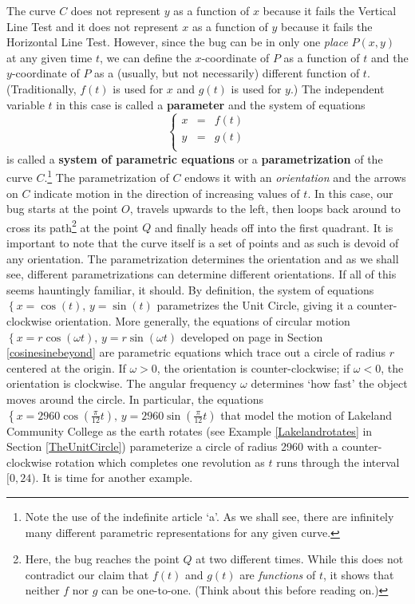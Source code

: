 The curve $C$ does not represent $y$ as a function of $x$ because it fails the Vertical Line Test and it does not represent $x$ as a function of $y$ because it fails the Horizontal Line Test.  However, since the bug can be in only one \textit{place} $P(x,y)$ at any given time $t$, we can define the $x$-coordinate of $P$ as a function of $t$ and the $y$-coordinate of $P$ as a (usually, but not necessarily) different function of $t$. (Traditionally, $f(t)$ is used for $x$ and $g(t)$ is used for $y$.) The independent variable $t$ in this case is called a  \textbf{parameter} and the system of equations \[\left\{ \begin{array}{rcl} x & = & f(t) \\ y & = & g(t) \\ \end{array} \right.\] is called a  \textbf{system of parametric equations} or a  \textbf{parametrization} of the curve $C$.\footnote{Note the use of the indefinite article `a'.  As we shall see, there are infinitely many different parametric representations for any given curve.}   The parametrization of $C$ endows it with an  \textit{orientation} and the arrows on $C$ indicate motion in the direction of increasing values of $t$. In this case, our bug starts at the point $O$, travels upwards to the left, then loops back around to cross its path\footnote{Here, the bug reaches the point $Q$ at two different times. While this does not contradict our claim that $f(t)$ and $g(t)$ are \textit{functions} of $t$, it shows that neither $f$ nor $g$ can be one-to-one.  (Think about this before reading on.)} at the point $Q$ and finally heads off into the first quadrant.   It is important to note that the curve itself is a set of points and as such is devoid of any orientation.  The parametrization determines the orientation and as we shall see, different parametrizations can determine different orientations. If all of this seems hauntingly familiar, it should.  By definition, the system of equations $\left\{ x = \cos(t), \, y = \sin(t) \right.$ parametrizes the Unit Circle, giving it a counter-clockwise orientation.  More generally, the equations of circular motion $\left\{ x = r\cos(\omega t), \, y = r\sin(\omega t) \right.$ developed on page \pageref{equationsforcircularmotion} in Section \ref{cosinesinebeyond} are parametric equations which trace out a circle of radius $r$ centered at the origin.  If $\omega > 0$, the orientation is counter-clockwise;  if $\omega < 0$, the orientation is clockwise.  The angular frequency $\omega$ determines `how fast' the object moves around the circle. In particular, the equations  $\left\{ x = 2960 \cos\left(\frac{\pi}{12} t\right), \, y  = 2960 \sin\left(\frac{\pi}{12} t\right) \right.$ that model the motion of Lakeland Community College as the earth rotates (see Example \ref{Lakelandrotates} in Section \ref{TheUnitCircle}) parameterize a circle of radius 2960 with a counter-clockwise rotation which completes one revolution as $t$ runs through the interval $[0,24)$.  It is time for another example.

